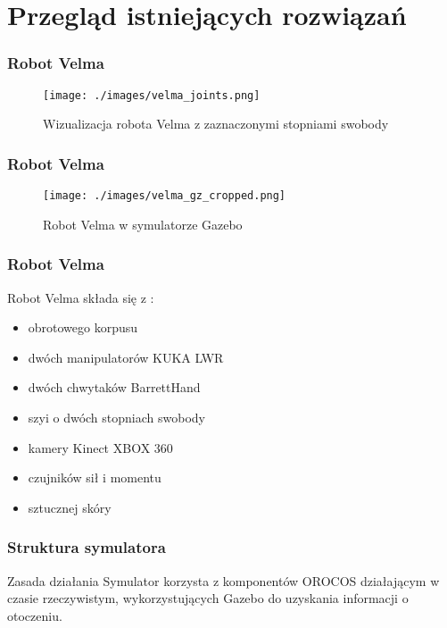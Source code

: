 \section{Przegląd istniejących rozwiązań}


\begin{frame}
\frametitle{Robot Velma}
\begin{figure}
\texttt{[image: ./images/velma\_joints.png]}
\caption{Wizualizacja robota Velma z zaznaczonymi stopniami swobody}
\end{figure}
\end{frame}


\begin{frame}
\frametitle{Robot Velma}
\begin{figure}
	\texttt{[image: ./images/velma\_gz\_cropped.png]}
	\caption{Robot Velma w symulatorze Gazebo}
\end{figure}
\end{frame}


\begin{frame}
\frametitle{Robot Velma}
Robot Velma składa się z \cite{docsVelma}:  
\begin{itemize}
	\item obrotowego korpusu
	\item dwóch manipulatorów KUKA LWR
	\item dwóch chwytaków BarrettHand
	\item szyi o dwóch stopniach swobody
	\item kamery Kinect XBOX 360
	\item czujników sił i momentu
	\item sztucznej skóry
\end{itemize}
\end{frame}


\begin{frame}
\frametitle{Struktura symulatora}
\begin{block}{Zasada działania}
	Symulator korzysta z komponentów OROCOS działającym w czasie rzeczywistym, wykorzystujących Gazebo
	do uzyskania informacji o otoczeniu.
\end{block}
\end{frame}

